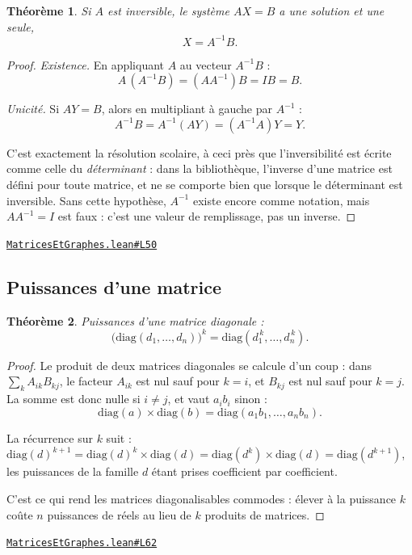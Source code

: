 \documentclass[11pt,a4paper]{article}
\theoremstyle{definition}
\theoremstyle{plain}
\newtheorem{theoreme}{Théorème}
\newcommand{\source}[2]{\par\smallskip\noindent\hfill{\footnotesize\href{#1}{\texttt{#2}}}\par\smallskip}
\begin{document}
\begin{theoreme}
Si $A$ est inversible, le système $AX = B$ a une solution et une seule,
\[ X = A^{-1}B . \]
\end{theoreme}

\begin{proof}
\emph{Existence.} En appliquant $A$ au vecteur $A^{-1}B$ :
\[ A\,(A^{-1}B) = (AA^{-1})B = IB = B . \]

\emph{Unicité.} Si $AY = B$, alors en multipliant à gauche par $A^{-1}$ :
\[ A^{-1}B = A^{-1}(AY) = (A^{-1}A)Y = Y . \]

\medskip\noindent
C'est exactement la résolution scolaire, à ceci près que l'inversibilité est écrite comme
celle du \emph{déterminant} : dans la bibliothèque, l'inverse d'une matrice est défini pour
toute matrice, et ne se comporte bien que lorsque le déterminant est inversible. Sans cette
hypothèse, $A^{-1}$ existe encore comme notation, mais $AA^{-1} = I$ est faux : c'est une
valeur de remplissage, pas un inverse.
\end{proof}
\source{https://github.com/Commutator-IO/learn-lean/blob/main/courses/02-lycee/10-specialite-mathematiques-terminale-s/MatricesEtGraphes.lean\#L50}{MatricesEtGraphes.lean\#L50}

\subsection{Puissances d'une matrice}

\begin{theoreme}
Puissances d'une matrice diagonale :
\[ \bigl(\mathrm{diag}(d_1, \dots, d_n)\bigr)^{k}
   = \mathrm{diag}(d_1^{\,k}, \dots, d_n^{\,k}) . \]
\end{theoreme}

\begin{proof}
Le produit de deux matrices diagonales se calcule d'un coup : dans
$\sum_k A_{ik} B_{kj}$, le facteur $A_{ik}$ est nul sauf pour $k = i$, et $B_{kj}$ est nul
sauf pour $k = j$. La somme est donc nulle si $i \ne j$, et vaut $a_i b_i$ sinon :
\[ \mathrm{diag}(a) \times \mathrm{diag}(b) = \mathrm{diag}(a_1b_1, \dots, a_nb_n) . \]

La récurrence sur $k$ suit : $\mathrm{diag}(d)^{k+1} = \mathrm{diag}(d)^{k} \times
\mathrm{diag}(d) = \mathrm{diag}(d^{k}) \times \mathrm{diag}(d) = \mathrm{diag}(d^{k+1})$,
les puissances de la famille $d$ étant prises coefficient par coefficient.

C'est ce qui rend les matrices diagonalisables commodes : élever à la puissance $k$ coûte
$n$ puissances de réels au lieu de $k$ produits de matrices.
\end{proof}
\source{https://github.com/Commutator-IO/learn-lean/blob/main/courses/02-lycee/10-specialite-mathematiques-terminale-s/MatricesEtGraphes.lean\#L62}{MatricesEtGraphes.lean\#L62}
\end{document}
